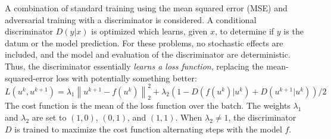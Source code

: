 \documentclass{article}
\begin{document}


A combination of standard training using the mean squared error (MSE) and
adversarial training with a discriminator is considered. A conditional
discriminator $D(y|x)$ is optimized which learns, given $x$, to determine
if $y$ is the datum or the model prediction. For these problems, no
stochastic effects are included, and the model and evaluation of the
discriminator are deterministic. Thus, the
discriminator essentially {\em learns a loss function}, replacing the
mean-squared-error loss with potentially something better:
\begin{equation}
L\left(u^k,u^{k+1}\right) = \lambda_1 \left\| u^{k+1}-f(u^k)
\right\|_2^2 + \lambda_2\left(1 - D\left(f(u^k)|u^k\right) + D\left(u^{k+1}|u^k\right)\right)/2
\end{equation}
The cost function is the mean of the loss function over the batch.
The weights $\lambda_1$ and $\lambda_2$ are set to $(1,0)$, $(0,1)$, and $(1,1)$. When $\lambda_2\neq 1$, the
discriminator $D$ is trained to maximize the cost function alternating
steps with the model $f$.

\end{document}

